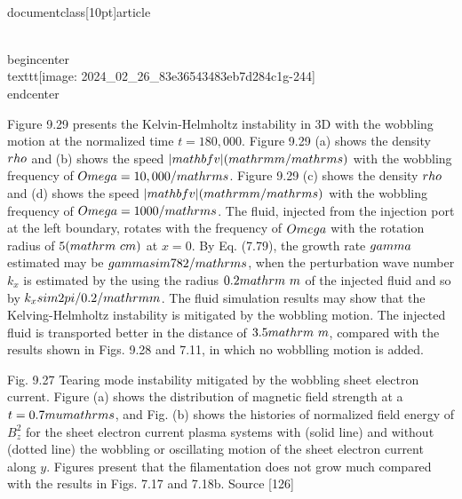 \\documentclass[10pt]{article}
\begin{document}
{{{{{{\\begin{center}
\\texttt{[image: 2024\_02\_26\_83e36543483eb7d284c1g-244]}
\\end{center}

Figure 9.29 presents the Kelvin-Helmholtz instability in 3D with the wobbling motion at the normalized time $t=180,000$. Figure 9.29 (a) shows the density $\\rho$ and (b) shows the speed $|\\mathbf{v}|(\\mathrm{m} / \\mathrm{s})$ with the wobbling frequency of $\\Omega=10,000 / \\mathrm{s}$. Figure 9.29 (c) shows the density $\\rho$ and (d) shows the speed $|\\mathbf{v}|(\\mathrm{m} / \\mathrm{s})$ with the wobbling frequency of $\\Omega=1000 / \\mathrm{s}$. The fluid, injected from the injection port at the left boundary, rotates with the frequency of $\\Omega$ with the rotation radius of $5(\\mathrm{~cm})$ at $x=0$. By Eq. (7.79), the growth rate $\\gamma$ estimated may be $\\gamma \\sim 782 / \\mathrm{s}$, when the perturbation wave number $k_{x}$ is estimated by the using the radius $0.2 \\mathrm{~m}$ of the injected fluid and so by $k_{x} \\sim 2 \\pi / 0.2 / \\mathrm{m}$. The fluid simulation results may show that the Kelving-Helmholtz instability is mitigated by the wobbling motion. The injected fluid is transported better in the distance of $3.5 \\mathrm{~m}$, compared with the results shown in Figs. 9.28 and 7.11, in which no wobblling motion is added.

Fig. 9.27 Tearing mode instability mitigated by the wobbling sheet electron current. Figure (a) shows the distribution of magnetic field strength at a $t=0.7 \\mu \\mathrm{s}$, and Fig. (b) shows the histories of normalized field energy of $B_{z}^{2}$ for the sheet electron current plasma systems with (solid line) and without (dotted line) the wobbling or oscillating motion of the sheet electron current along $y$. Figures present that the filamentation does not grow much compared with the results in Figs. 7.17 and 7.18b. Source [126]

}}}}}}
\end{document}

